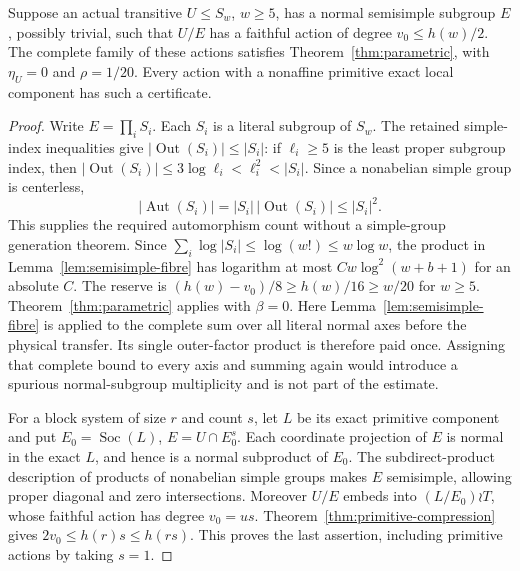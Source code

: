 \begin{theorem}
\label{thm:semisimple-compression}
Suppose an actual transitive $U\leq S_w$, $w\geq5$, has a normal
semisimple subgroup $E$, possibly trivial, such that $U/E$ has a
faithful action of degree $v_0\leq h(w)/2$. The complete family of
these actions satisfies Theorem~\ref{thm:parametric}, with
$\eta_U=0$ and $\rho=1/20$.
Every action with a nonaffine primitive exact local component has
such a certificate.
\end{theorem}
\begin{proof}
Write $E=\prod_iS_i$. Each $S_i$ is a literal subgroup of $S_w$.
The retained simple-index inequalities give
$|\operatorname{Out}(S_i)|\leq|S_i|$: if $\ell_i\geq5$ is the least
proper subgroup index, then
$|\operatorname{Out}(S_i)|\leq3\log\ell_i<\ell_i^2<|S_i|$.
Since a nonabelian simple group is centerless,
\[
 |\operatorname{Aut}(S_i)|
   =|S_i|\,|\operatorname{Out}(S_i)|\leq|S_i|^2.
\]
This supplies the required automorphism count without a simple-group
generation theorem.
Since $\sum_i\log|S_i|\leq\log(w!)\leq w\log w$, the product in
Lemma~\ref{lem:semisimple-fibre} has logarithm at most
$Cw\log^2(w+b+1)$ for an absolute $C$. The reserve is
$(h(w)-v_0)/8\geq h(w)/16\geq w/20$ for $w\geq5$.
Theorem~\ref{thm:parametric} applies with $\beta=0$.
Here Lemma~\ref{lem:semisimple-fibre} is applied to the complete sum over
all literal normal axes before the physical transfer.  Its single
outer-factor product is therefore paid once.  Assigning that complete bound
to every axis and summing again would introduce a spurious normal-subgroup
multiplicity and is not part of the estimate.

For a block system of size $r$ and count $s$, let $L$ be its exact
primitive component and put $E_0=\operatorname{Soc}(L)$,
$E=U\cap E_0^s$. Each coordinate projection of $E$ is normal in
the exact $L$, and hence is a normal subproduct of $E_0$. The
subdirect-product description of products of nonabelian simple groups
makes $E$ semisimple, allowing proper diagonal and zero intersections.
Moreover $U/E$ embeds into $(L/E_0)\wr T$, whose faithful action
has degree $v_0=us$. Theorem~\ref{thm:primitive-compression} gives
$2v_0\leq h(r)s\leq h(rs)$. This proves the last assertion,
including primitive actions by taking $s=1$.
\end{proof}
